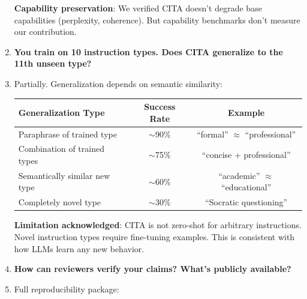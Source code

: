 \begin{enumerate}[label=\textbf{Q\arabic*.}, leftmargin=*, itemsep=8pt]
\textbf{Capability preservation}: We verified CITA doesn't degrade base capabilities (perplexity, coherence). But capability benchmarks don't measure our contribution.

\vspace{4mm}

\item[\ding{93}] \textbf{You train on 10 instruction types. Does CITA generalize to the 11th unseen type?}

\item[\ding{224}] Partially. Generalization depends on semantic similarity:

\begin{table}[H]
\centering
\small
\begin{tabular}{@{}lcc@{}}
\toprule
\textbf{Generalization Type} & \textbf{Success Rate} & \textbf{Example} \\
\midrule
Paraphrase of trained type & $\sim$90\% & ``formal'' $\approx$ ``professional'' \\
\hline
Combination of trained types & $\sim$75\% & ``concise + professional'' \\
\hline
Semantically similar new type & $\sim$60\% & ``academic'' $\approx$ ``educational'' \\
\hline
Completely novel type & $\sim$30\% & ``Socratic questioning'' \\
\bottomrule
\end{tabular}
\end{table}

\textbf{Limitation acknowledged}: CITA is not zero-shot for arbitrary instructions. Novel instruction types require fine-tuning examples. This is consistent with how LLMs learn any new behavior.

\vspace{4mm}

\item[\ding{93}] \textbf{How can reviewers verify your claims? What's publicly available?}

\item[\ding{224}] Full reproducibility package:


\end{enumerate}
